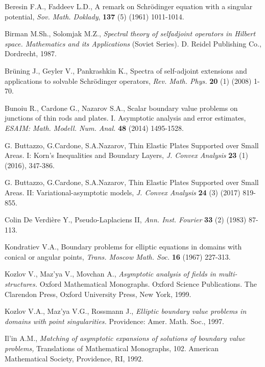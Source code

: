 \documentclass[11pt]{article}%
\numberwithin{equation}{section}
\begin{document}
\begin{thebibliography}{99}                                                                                               %


Beresin F.A., Faddeev L.D., A remark on Schr\"{o}dinger
equation with a singular potential, \textit{Sov. Math. Doklady}, \textbf{137}
(5) (1961) 1011-1014.

Birman M.Sh., Solomjak M.Z., \textit{Spectral theory of
selfadjoint operators in Hilbert space. Mathematics and its Applications}
(Soviet Series). D. Reidel Publishing Co., Dordrecht, 1987.

Br\"{u}ning J., Geyler V., Pankrashkin K., Spectra of
self-adjoint extensions and applications to solvable Schr\"{o}dinger
operators, \textit{Rev. Math. Phys.} \textbf{20} (1) (2008) 1-70.

Bunoiu R., Cardone G., Nazarov S.A., Scalar boundary value
problems on junctions of thin rods and plates. I. Asymptotic analysis and
error estimates, \textit{ESAIM: Math. Modell. Num. Anal.} \textbf{48} (2014) 1495-1528.

G. Buttazzo, G.Cardone, S.A.Nazarov, Thin Elastic Plates
Supported over Small Areas. I: Korn's Inequalities and Boundary Layers,
\textit{J. Convex Analysis} \textbf{23} (1) (2016), 347-386.

G. Buttazzo, G.Cardone, S.A.Nazarov, Thin Elastic Plates
Supported over Small Areas. II: Variational-asymptotic models, \textit{J.
Convex Analysis} \textbf{24} (3) (2017) 819-855.

Colin De Verdi\`{e}re Y., Pseudo-Laplaciens II, \textit{Ann.
Inst. Fourier} \textbf{33} (2) (1983) 87-113.

Kondratiev V.A., Boundary problems for elliptic equations in
domains with conical or angular points, \textit{Trans. Moscow Math. Soc.}
\textbf{16} (1967) 227-313.

Kozlov V., Maz'ya V., Movchan A., \textit{Asymptotic analysis
of fields in multi-structures.} Oxford Mathematical Monographs. Oxford Science
Publications. The Clarendon Press, Oxford University Press, New York, 1999.

Kozlov V.A., Maz'ya V.G., Rossmann J., \textit{Elliptic
boundary value problems in domains with point singularities.} Providence:
Amer. Math. Soc., 1997.

Il'in A.M., \textit{Matching of asymptotic expansions of
solutions of boundary value problems,} Translations of Mathematical
Monographs, 102. American Mathematical Society, Providence, RI, 1992.


\end{thebibliography}
\end{document}
